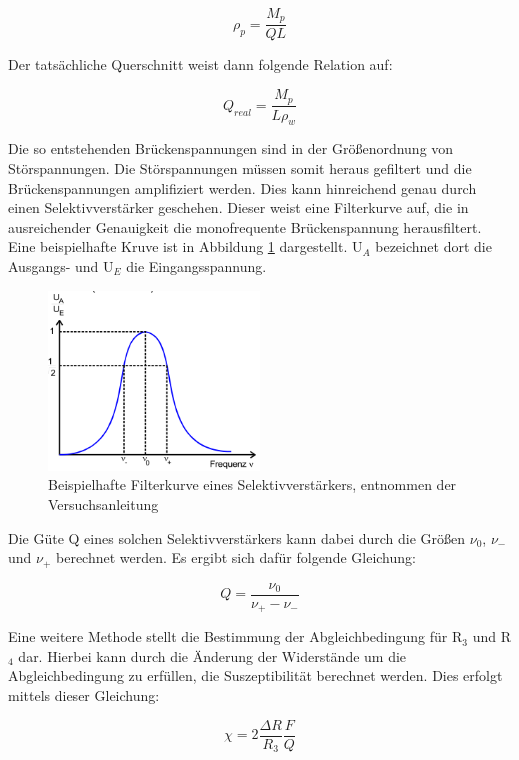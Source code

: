 \begin{equation}
  \rho_p = \frac{M_p}{Q L}
\end{equation}

Der tatsächliche Querschnitt weist dann folgende Relation auf:

\begin{equation}
  Q_{real} = \frac{M_p}{L \rho_w}
  \label{eqn:qreal}
\end{equation}

Die so entstehenden Brückenspannungen sind in der Größenordnung von Störspannungen.
Die Störspannungen müssen somit heraus gefiltert und die Brückenspannungen amplifiziert werden.
Dies kann hinreichend genau durch einen Selektivverstärker geschehen.
Dieser weist eine Filterkurve auf, die in ausreichender Genauigkeit die monofrequente Brückenspannung herausfiltert.
Eine beispielhafte Kruve ist in Abbildung \ref{fig:theofilterkurve} dargestellt.
U$_A$ bezeichnet dort die Ausgangs- und U$_E$ die Eingangsspannung.

\begin{figure}
  \centering
  \includegraphics[width=0.5\textwidth]{images/theodiefilterkurve.png}
  \caption{Beispielhafte Filterkurve eines Selektivverstärkers, entnommen der Versuchsanleitung\cite[182]{sample}}
  \label{fig:theofilterkurve}
\end{figure}

Die Güte Q eines solchen Selektivverstärkers kann dabei durch die Größen $\nu_0$, $\nu_-$ und $\nu_+$ berechnet werden.
Es ergibt sich dafür folgende Gleichung:

\begin{equation}
  Q = \frac{\nu_0}{\nu_+ - \nu_-}
\end{equation}

Eine weitere Methode stellt die Bestimmung der Abgleichbedingung für R$_3$ und R$_4$ dar.
Hierbei kann durch die Änderung der Widerstände um die Abgleichbedingung zu erfüllen, die Suszeptibilität berechnet werden.
Dies erfolgt mittels dieser Gleichung:

\begin{equation}
  \chi = 2 \frac{\Delta R}{R_3} \frac{F}{Q}
  \label{eqn:chi2}
\end{equation}
